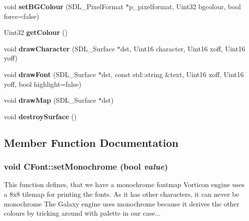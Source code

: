 \begin{DoxyCompactItemize}
\item 
\hypertarget{class_c_font_a598307d0cf3ca498cbc527a7bde901e8}{
void {\bfseries setBGColour} (SDL\_\-PixelFormat $\ast$p\_\-pixelformat, Uint32 bgcolour, bool force=false)}
\label{class_c_font_a598307d0cf3ca498cbc527a7bde901e8}

\item 
\hypertarget{class_c_font_a134501e38622dac5a2c9d09c540bcbbc}{
Uint32 {\bfseries getColour} ()}
\label{class_c_font_a134501e38622dac5a2c9d09c540bcbbc}

\item 
\hypertarget{class_c_font_aeab44df5be9e33b2dcacc646be9774ce}{
void {\bfseries drawCharacter} (SDL\_\-Surface $\ast$dst, Uint16 character, Uint16 xoff, Uint16 yoff)}
\label{class_c_font_aeab44df5be9e33b2dcacc646be9774ce}

\item 
\hypertarget{class_c_font_aff05654d3722c3d0a6939b5317109437}{
void {\bfseries drawFont} (SDL\_\-Surface $\ast$dst, const std::string \&text, Uint16 xoff, Uint16 yoff, bool highlight=false)}
\label{class_c_font_aff05654d3722c3d0a6939b5317109437}

\item 
\hypertarget{class_c_font_a5e95e0bf3be87e7803aa2cad7bf3bb0b}{
void {\bfseries drawMap} (SDL\_\-Surface $\ast$dst)}
\label{class_c_font_a5e95e0bf3be87e7803aa2cad7bf3bb0b}

\item 
\hypertarget{class_c_font_a7a3376a3ad0c38935ac8c59e4cc9054d}{
void {\bfseries destroySurface} ()}
\label{class_c_font_a7a3376a3ad0c38935ac8c59e4cc9054d}

\end{DoxyCompactItemize}


\subsection{Member Function Documentation}
\hypertarget{class_c_font_a016ae0598f2cc8d985790c0204b31663}{
\subsubsection[{setMonochrome}]{\setlength{\rightskip}{0pt plus 5cm}void CFont::setMonochrome (bool {\em value})}}
\label{class_c_font_a016ae0598f2cc8d985790c0204b31663}


This function defines, that we have a monochrome fontmap Vorticon engine uses a 8x8 tilemap for printing the fonts. As it has other characters, it can never be monochrome The Galaxy engine uses monochrome because it derives the other colours by tricking around with palette in our case... 


